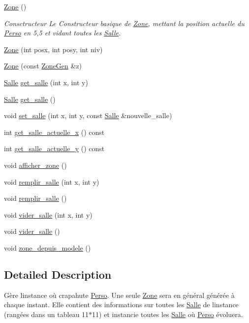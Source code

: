 \begin{DoxyCompactItemize}
\item 
\hyperlink{classZone_a37c9721c0d592a7a231f4e6dbae93277}{Zone} ()
\begin{DoxyCompactList}\small\item\em Consctructeur Le Constructeur basique de \hyperlink{classZone}{Zone}, mettant la position actuelle du \hyperlink{classPerso}{Perso} en 5,5 et vidant toutes les \hyperlink{classSalle}{Salle}. \end{DoxyCompactList}\item 
\hyperlink{classZone_a47c33a8aad7a0c17ff8ab213aad492f7}{Zone} (int posx, int posy, int niv)
\item 
\hyperlink{classZone_afddea0858e93cf8050e6263347b6864f}{Zone} (const \hyperlink{classZoneGen}{Zone\+Gen} \&z)
\item 
\hyperlink{classSalle}{Salle} \hyperlink{classZone_a6b28456d584e884cdeceaf6d4dcedbd1}{get\+\_\+salle} (int x, int y)
\item 
\hyperlink{classSalle}{Salle} \hyperlink{classZone_ab49f3b9677e9111970689cf26fa47b00}{get\+\_\+salle} ()
\item 
void \hyperlink{classZone_a5c68a620d5c32cd2bf26272aeaee557d}{set\+\_\+salle} (int x, int y, const \hyperlink{classSalle}{Salle} \&nouvelle\+\_\+salle)
\item 
int \hyperlink{classZone_a5cba037223549a19e4717c9a502895ca}{get\+\_\+salle\+\_\+actuelle\+\_\+x} () const 
\item 
int \hyperlink{classZone_a481d145df776bb245a223e6848b9a6d6}{get\+\_\+salle\+\_\+actuelle\+\_\+y} () const 
\item 
void \hyperlink{classZone_ae7fc481efb7e4bb2fc28bb5da0bbaf90}{afficher\+\_\+zone} ()
\item 
void \hyperlink{classZone_ae97ba3cc2a452803a66dbd3c0c84852b}{remplir\+\_\+salle} (int x, int y)
\item 
void \hyperlink{classZone_a76284023033d6b67f933b4656a8eb761}{remplir\+\_\+salle} ()
\item 
void \hyperlink{classZone_a296f45a66db2f5ad565d15274f628e72}{vider\+\_\+salle} (int x, int y)
\item 
void \hyperlink{classZone_a0f61f5c9028db56ef251371818b31b35}{vider\+\_\+salle} ()
\item 
void \hyperlink{classZone_a10185a1302e95287b7df98bf37a9b8fb}{zone\+\_\+depuis\+\_\+modele} ()
\end{DoxyCompactItemize}


\subsection{Detailed Description}
Gère l\textquotesingle{}instance où crapahute \hyperlink{classPerso}{Perso}. Une seule \hyperlink{classZone}{Zone} sera en général générée à chaque instant. Elle contient des informations sur toutes les \hyperlink{classSalle}{Salle} de l\textquotesingle{}instance (rangées dans un tableau 11$\ast$11) et instancie toutes les \hyperlink{classSalle}{Salle} où \hyperlink{classPerso}{Perso} évoluera. 

